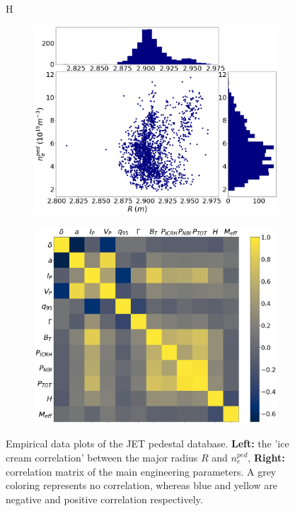 \documentclass[a4paper, twoside, final, 12pt]{article}
\begin{document}
\begin{figure}{H}
        \centering
        \begin{subfigure}{0.5\linewidth}
                \centering
                \includegraphics[scale=0.2]{./src/R_vs_NEPED_matplotlib}
        \end{subfigure} \hfill
        \begin{subfigure}{0.45\linewidth}
                \centering
                \includegraphics[scale=0.2]{./src/input_correlations}
        \end{subfigure}
	\caption{Empirical data plots of the JET pedestal database. \textbf{Left:} the 'ice cream correlation' between the major radius $R$ and $n_e^{ped}$,  \textbf{Right:}  correlation matrix of the main engineering parameters. A grey coloring represents no correlation, whereas blue and yellow are negative and positive correlation respectively.}
	\label{fig:emperical}
\end{figure}
\end{document}

